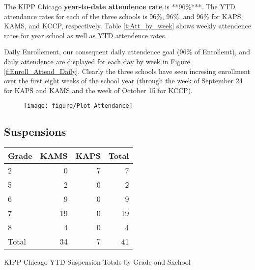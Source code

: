 \documentclass[sfsidenotes, justified]{tufte-handout}\usepackage{graphicx, color}
\newenvironment{knitrout}{}{} %
\begin{document}
The KIPP Chicago \textbf{year-to-date attendence rate} is **96\%***. The YTD attendance rates for each of the three schools is 96\%, 96\%, and 96\% for KAPS, KAMS, and KCCP, respectively.   Table \ref{t:Att_by_week} shows weekly attendence rates for year school as well as YTD attendence rates. 

Daily Enrollement, our consequent daily attendence goal (96\% of Enrollemt), and daily attendence are displayed for each day by week in Figure \ref{f:Enroll_Attend_Daily}.  Clearly the three schools have seen incresing enrollment over the first eight weeks of the school year (through the week of September 24 for KAPS and KAMS and the week of October 15 for KCCP).  

\begin{figure*}[b!]
\begin{knitrout}
\color{fgcolor}

{\centering \texttt{[image: figure/Plot\_Attendance]} 

}


\end{knitrout}

\end{figure*}\label{f:Enroll_Attend_Daily}

\subsection{Suspensions}




\begin{margintable}

{\small
\begin{tabular}{lrrr}
  \hline
Grade & KAMS & KAPS & Total \\ 
  \hline
2 & 0 & 7 & 7 \\ 
  5 & 2 & 0 & 2 \\ 
  6 & 9 & 0 & 9 \\ 
  7 & 19 & 0 & 19 \\ 
  8 & 4 & 0 & 4 \\ 
  Total & 34 & 7 & 41 \\ 
   \hline
\end{tabular}
}



\caption{KIPP Chicago YTD Suspension Totals by Grade and Sxchool}
\end{margintable}
\end{document}
